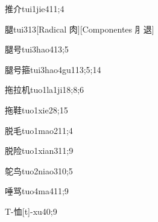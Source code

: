 \begin{verbete}{推介}{tui1jie4}{11;4}
\end{verbete}

\begin{verbete}{腿}{tui3}{13}[Radical 肉][Componentes ⺼退]
\end{verbete}

\begin{verbete}{腿号}{tui3hao4}{13;5}
\end{verbete}

\begin{verbete}{腿号箍}{tui3hao4gu1}{13;5;14}
\end{verbete}

\begin{verbete}{拖拉机}{tuo1la1ji1}{8;8;6}
\end{verbete}

\begin{verbete}{拖鞋}{tuo1xie2}{8;15}
\end{verbete}

\begin{verbete}{脱毛}{tuo1mao2}{11;4}
\end{verbete}

\begin{verbete}{脱险}{tuo1xian3}{11;9}
\end{verbete}

\begin{verbete}{鸵鸟}{tuo2niao3}{10;5}
\end{verbete}

\begin{verbete}{唾骂}{tuo4ma4}{11;9}
\end{verbete}

\begin{verbete}{T-恤}{[t]-xu4}{0;9}
\end{verbete}

